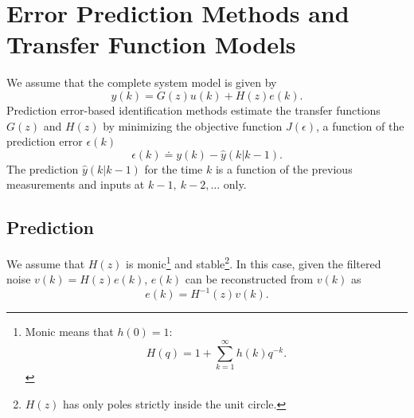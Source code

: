 \chapter{Error Prediction Methods and Transfer Function Models}
\label{chap:error-prediction-methods-tf}

We assume that the complete system model is given by
\begin{equation}
  \label{eq:PEM-tf-models}
  y(k) = G(z)u(k) + H(z)e(k).
\end{equation}
Prediction error-based identification methods estimate the transfer functions $G(z)$ and $H(z)$ by minimizing the objective function $J(\epsilon)$, a function of the prediction error $\epsilon(k)$
\begin{equation*}
  \epsilon(k) \doteq y(k) - \hat{y}(k|k-1).
\end{equation*}
The prediction $\hat{y}(k|k-1)$ for the time $k$ is a function of the previous measurements and inputs at $k-1,\ k-2,\ldots$ only.

\section{Prediction}
\label{sec:prediction}

We assume that $H(z)$ is monic\footnote{Monic means that $h(0)=1$:
\begin{equation*}
  H(q) = 1 + \sum_{k=1}^\infty h(k)q^{-k}.
\end{equation*}} and stable\footnote{$H(z)$ has only poles strictly inside the unit circle.}. In this case, given the filtered noise $v(k)=H(z)e(k)$, $e(k)$ can be reconstructed from $v(k)$ as
\begin{equation}
  \label{eq:noise-reconstruction}
  e(k) = H^{-1}(z)v(k).
\end{equation}

